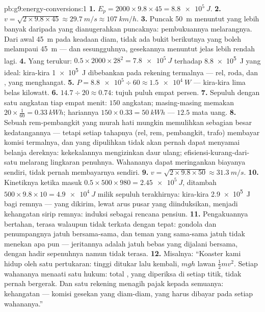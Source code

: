 \begin{solution}{pb:g9:energy-conversions:1}
\textbf{1.} $E_p = 2000 \times 9.8 \times 45 =
\qty{8.8e5}{J}$.
\textbf{2.} $v = \sqrt{2 \times 9.8 \times 45} \approx
\qty{29.7}{m/s} \approx \qty{107}{km/h}$.
\textbf{3.} Puncak \qty{50}{m} menuntut  yang lebih banyak
daripada yang dianugerahkan puncaknya: pembukuannya melarangnya. Dari
awal \qty{45}{m} pada keadaan diam, tidak ada bukit berikutnya yang
boleh melampaui \qty{45}{m} --- dan sesungguhnya, gesekannya menuntut
jelas lebih rendah lagi.
\textbf{4.} Yang terukur: $0.5 \times 2000 \times 28^2 =
\qty{7.8e5}{J}$ terhadap \qty{8.8e5}{J} yang ideal: kira-kira
\qty{1e5}{J} dibebankan pada rekening termalnya --- rel, roda, dan
, yang menghangat.
\textbf{5.} $P = \num{8.8e5} \div 60 \approx
\qty{1.5e4}{W}$ --- kira-kira lima belas kilowatt.
\textbf{6.} $14.7 \div 20 \approx 0.74$: tujuh puluh empat persen.
\textbf{7.} Sepuluh  dengan satu angkatan tiap empat menit: $150$
angkatan; masing-masing memakan $20 \times \tfrac{1}{60} =
\qty{0.33}{kWh}$; hariannya $150 \times 0.33 = \qty{50}{kWh}$
--- $12.5$  mata uang.
\textbf{8.} Sebuah rem-pembangkit yang murah hati mungkin memulihkan
sebagian besar  kedatangannya --- tetapi setiap tahapnya
(rel, rem, pembangkit, trafo) membayar komisi termalnya, dan 
yang dipulihkan tidak akan pernah dapat menyamai belanja dereknya:
kekekalannya mengizinkan daur ulang; efisiensi-kurang-dari-satu
melarang lingkaran penuhnya. Wahananya dapat meringankan biayanya
sendiri, tidak pernah membayarnya sendiri.
\textbf{9.} $v = \sqrt{2 \times 9.8 \times 50} \approx
\qty{31.3}{m/s}$.
\textbf{10.} Kinetiknya ketika masuk $0.5 \times 500 \times 980 =
\qty{2.45e5}{J}$, ditambah $500 \times 9.8
\times 10 = \qty{4.9e4}{J}$ milik sepuluh  terakhirnya:
kira-kira \qty{2.9e5}{J} bagi remnya --- yang dikirim, lewat arus
pusar yang diinduksikan, menjadi kehangatan sirip remnya: induksi
sebagai rencana pensiun.
\textbf{11.} Pengakuannya bertahan, terasa walaupun tidak terkata
dengan tepat: gondola dan penumpangnya jatuh bersama-sama, dan teman
yang sama-sama jatuh tidak menekan apa pun --- jeritannya adalah jatuh
bebas yang dijalani bersama, dengan  hadir sepenuhnya namun
tidak terasa.
\textbf{12.} Misalnya: ``Koaster kami hidup oleh satu pertukaran:
tinggi ditukar  lalu kembali, $m g h$ lawan $\frac12 m v^2$.
Setiap wahananya menaati satu hukum: total , yang diperiksa
di setiap titik, tidak pernah bergerak. Dan satu rekening menagih
pajak kepada semuanya: kehangatan --- komisi gesekan yang diam-diam,
yang harus dibayar pada setiap wahananya.''
\end{solution}
